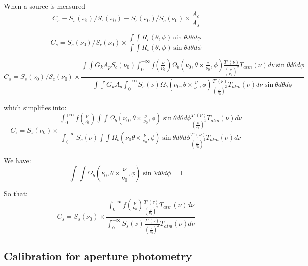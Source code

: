 When a source is measured 
\begin{equation} 
C_{s} = S_{s} (\nu_{0}) / S_{q}(\nu_{0}) = S_{s}(\nu_0) / S_{c} (\nu_{0})  \times \frac{A_{c}}{A_{s}}
\end{equation}


\begin{equation} 
C_{s} = S_{s}(\nu_{0}) / S_{c} (\nu_{0})  \times \frac{\int \int
R_{c}(\theta, \phi) \sin \theta d\theta d\phi }{\int \int
R_{s}(\theta, \phi) \sin \theta d\theta d\phi }
\end{equation}

\begin{equation}
C_{s} = S_{s}(\nu_{0}) / S_{c} (\nu_{0})  \times \frac{
  \int\int G_{k} A_{p} S_{c}(\nu_{0})\int_{0}^{+\infty} f(\frac{\nu}{\nu_{0}}) \Omega_{b}(\nu_{0}, \theta \times \frac{\nu}{\nu_{0}},
\phi) \frac{T'(\nu)}{\left(\frac{\nu}{\nu_{0}}\right)^{2}} 
T_{atm}(\nu) d\nu \sin \theta d\theta d\phi}
{\int \int G_{k}
A_{p} \int_{0}^{+\infty} S_{s}(\nu) \Omega_{b}(\nu_{0}, \theta \times \frac{\nu}{\nu_{0}},
\phi) \frac{T'(\nu)}{\left(\frac{\nu}{\nu_{0}}\right)^{2}} 
T_{atm}(\nu) d\nu \sin \theta d\theta d\phi
}
\end{equation}

which simplifies into:
\begin{equation}
C_{s} = S_{s}(\nu_{0})  \times \frac{
  \int_{0}^{+\infty} f(\frac{\nu}{\nu_{0}}) \int\int \Omega_{b}(\nu_{0}, \theta \times \frac{\nu}{\nu_{0}},
\phi)  \sin \theta d\theta d\phi \frac{T'(\nu)}{\left(\frac{\nu}{\nu_{0}}\right)^{2}} 
T_{atm}(\nu) d\nu}
{
\int_{0}^{+\infty} S_{s}(\nu) \int \int \Omega_{b}(\nu_{0} \theta \times \frac{\nu}{\nu_{0}},
\phi) \sin \theta  d\theta d\phi \frac{T'(\nu)}{\left(\frac{\nu}{\nu_{0}}\right)^{2}} 
T_{atm}(\nu) d\nu 
}
\end{equation}

We have:
\begin{equation}
\int\int \Omega_{b}(\nu_{0}, \theta \times \frac{\nu}{\nu_{0}},
\phi)  \sin \theta  d\theta d\phi = 1
\end{equation}

So that:
\begin{equation}
C_{s} = S_{s}(\nu_{0})  \times \frac{
  \int_{0}^{+\infty} f(\frac{\nu}{\nu_{0}}) \frac{T'(\nu)}{\left(\frac{\nu}{\nu_{0}}\right)^{2}} 
T_{atm}(\nu) d\nu}
{
\int_{0}^{+\infty} S_{s}(\nu)  \frac{T'(\nu)}{\left(\frac{\nu}{\nu_{0}}\right)^{2}} 
T_{atm}(\nu) d\nu 
}
\end{equation}


\subsection{Calibration for aperture photometry}

